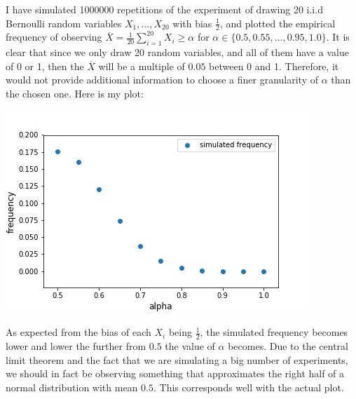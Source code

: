 I have simulated 1000000 repetitions of the experiment of drawing 20 i.i.d Bernoulli random variables $X_1,...,X_{20}$ with bias $\frac{1}{2}$, and plotted the empirical frequency of observing $\overline{X} = \frac{1}{20}\sum_{i=1}^{20}X_i \geq \alpha$ for $\alpha \in \{0.5,0.55,...,0.95,1.0 \}$. It is clear that since we only draw 20 random variables, and all of them have a value of 0 or 1, then the $\overline{X}$ will be a multiple of $0.05$ between 0 and 1. Therefore, it would not provide additional information to choose a finer granularity of $\alpha$ than the chosen one. Here is my plot:

\begin{center}
\includegraphics[scale = 0.7]{illustration_of_hoeffding/fig1.jpg}
\end{center}

As expected from the bias of each $X_i$ being $\frac{1}{2}$, the simulated frequency becomes lower and lower the further from $0.5$ the value of $\alpha$ becomes. Due to the central limit theorem and the fact that we are simulating a big number of experiments, we should in fact be observing something that approximates the right half of a normal distribution with mean $0.5$. This corresponds well with the actual plot.

